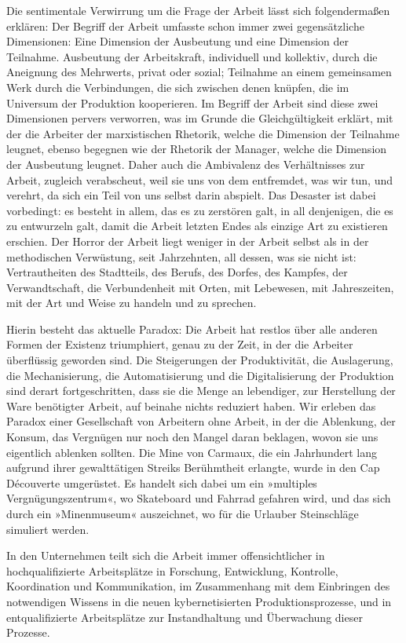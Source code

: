 Die sentimentale Verwirrung um die Frage der Arbeit lässt sich
folgendermaßen erklären: Der Begriff der Arbeit umfasste schon
immer zwei gegensätzliche Dimensionen: Eine Dimension der
Ausbeutung und eine Dimension der Teilnahme. Ausbeutung der
Arbeitskraft, individuell und kollektiv, durch die Aneignung des
Mehrwerts, privat oder sozial; Teilnahme an einem gemeinsamen Werk
durch die Verbindungen, die sich zwischen denen knüpfen, die im
Universum der Produktion kooperieren. Im Begriff der Arbeit sind
diese zwei Dimensionen pervers verworren, was im Grunde die
Gleichgültigkeit erklärt, mit der die Arbeiter der marxistischen
Rhetorik, welche die Dimension der Teilnahme leugnet, ebenso
begegnen wie der Rhetorik der Manager, welche die Dimension der
Ausbeutung leugnet. Daher auch die Ambivalenz des Verhältnisses zur
Arbeit, zugleich verabscheut, weil sie uns von dem entfremdet, was
wir tun, und verehrt, da sich ein Teil von uns selbst darin
abspielt. Das Desaster ist dabei vorbedingt: es besteht in allem,
das es zu zerstören galt, in all denjenigen, die es zu entwurzeln
galt, damit die Arbeit letzten Endes als einzige Art zu existieren
erschien. Der Horror der Arbeit liegt weniger in der Arbeit selbst
als in der methodischen Verwüstung, seit Jahrzehnten, all dessen,
was sie nicht ist: Vertrautheiten des Stadtteils, des Berufs, des
Dorfes, des Kampfes, der Verwandtschaft, die Verbundenheit mit
Orten, mit Lebewesen, mit Jahreszeiten, mit der Art und Weise zu
handeln und zu sprechen.

Hierin besteht das aktuelle Paradox: Die Arbeit hat restlos über
alle anderen Formen der Existenz triumphiert, genau zu der Zeit, in
der die Arbeiter überflüssig geworden sind. Die Steigerungen der
Produktivität, die Auslagerung, die Mechanisierung, die
Automatisierung und die Digitalisierung der Produktion sind derart
fortgeschritten, dass sie die Menge an lebendiger, zur Herstellung
der Ware benötigter Arbeit, auf beinahe nichts reduziert haben. Wir
erleben das Paradox einer Gesellschaft von Arbeitern ohne Arbeit,
in der die Ablenkung, der Konsum, das Vergnügen nur noch den Mangel
daran beklagen, wovon sie uns eigentlich ablenken sollten. Die Mine
von Carmaux, die ein Jahrhundert lang aufgrund ihrer gewalttätigen
Streiks Berühmtheit erlangte, wurde in den Cap Découverte
umgerüstet. Es handelt sich dabei um ein »multiples
Vergnügungszentrum«, wo Skateboard und Fahrrad gefahren wird, und
das sich durch ein »Minenmuseum« auszeichnet, wo für die Urlauber
Steinschläge simuliert werden.

In den Unternehmen teilt sich die Arbeit immer offensichtlicher in
hochqualifizierte Arbeitsplätze in Forschung, Entwicklung,
Kontrolle, Koordination und Kommunikation, im Zusammenhang mit dem
Einbringen des notwendigen Wissens in die neuen kybernetisierten
Produktionsprozesse, und in entqualifizierte Arbeitsplätze zur
Instandhaltung und Überwachung dieser Prozesse.

